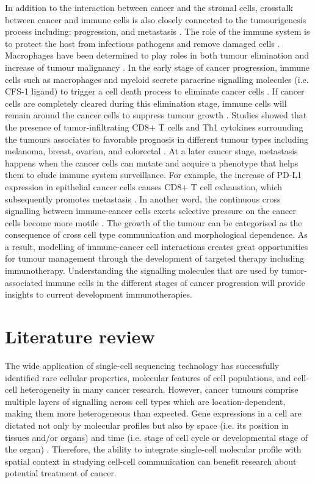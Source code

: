 In addition to the interaction between cancer and the stromal cells, crosstalk between cancer and immune cells is also closely connected to the tumourigenesis process including: progression, and metastasis \cite{wang2017role}. The role of the immune system is to protect the host from infectious pathogens and remove damaged cells \cite{davis2007molecular}. Macrophages have been determined to play roles in both tumour elimination and increase of tumour malignancy \cite{wyckoff2007direct, chung2005molecular}. In the early stage of cancer progression, immune cells such as macrophages and myeloid secrete paracrine signalling molecules (i.e. CFS-1 ligand)  to trigger a cell death process to eliminate cancer cells \cite{wyckoff2007direct}. If cancer cells are completely cleared during this elimination stage, immune cells will remain around the cancer cells to suppress tumour growth \cite{bronkhorst2011detection, ly2010aged}. Studies showed that the presence of tumor-infiltrating CD8+ T cells and Th1 cytokines surrounding the tumours associates to favorable prognosis in different tumour types including melanoma, breast, ovarian, and colorectal \cite{fridman2012immune, shalapour2015immunity}. At a later cancer stage, metastasis happens when the cancer cells can mutate and acquire a phenotype that helps them to elude immune system surveillance. For example, the increase of PD-L1 expression in epithelial cancer cells causes CD8+ T cell exhaustion, which subsequently promotes metastasis \cite{chen2014metastasis, wei2019combination}. In another word, the continuous cross signalling between immune-cancer cells exerts selective pressure on the cancer cells become more motile \cite{giampieri2009localized,ilina2009mechanisms}. The growth of the tumour can be categorised as the consequence of cross cell type communication and morphological dependence. As a result, modelling of immune-cancer cell interactions creates great opportunities for tumour management through the development of targeted therapy including immunotherapy. Understanding the signalling molecules that are used by tumor-associated immune cells in the different stages of cancer progression will provide insights to current development immunotherapies.  

\section{Literature review}
The wide application of single-cell sequencing technology has successfully identified rare cellular properties, molecular features of cell populations, and cell-cell heterogeneity in many cancer research. However, cancer tumours comprise multiple layers of signalling across cell types which are location-dependent, making them more heterogeneous than expected. Gene expressions in a cell are dictated not only by molecular profiles but also by space (i.e. its position in tissues and/or organs) and time (i.e. stage of cell cycle or developmental stage of the organ) \cite{salomon2020genomic}. Therefore, the ability to integrate single-cell molecular profile with spatial context in studying cell-cell communication can benefit research about potential treatment of cancer.

